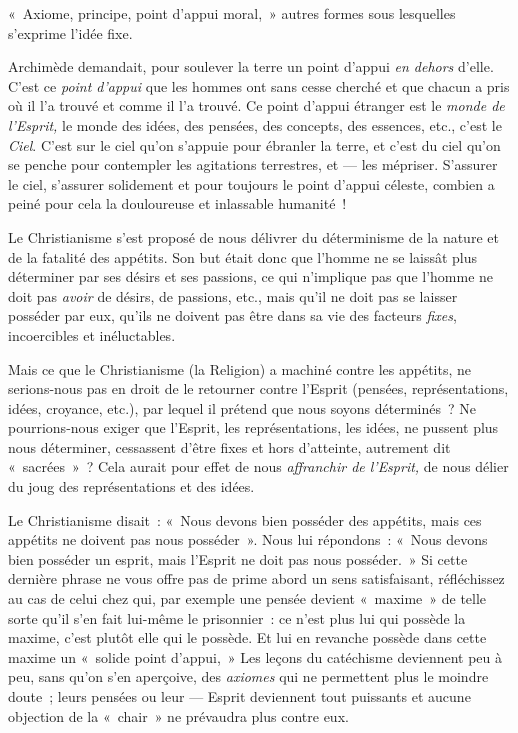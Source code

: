 \documentclass[french,twoside]{book} %
\begin{document}
\noindent « Axiome, principe, point d’appui moral, » autres formes sous lesquelles s’exprime l’idée fixe.\par
Archimède demandait, pour soulever la terre un point d’appui \emph{en dehors} d’elle. C’est ce \emph{point d’appui} que les hommes ont sans cesse cherché et que chacun a pris où il l’a trouvé et comme il l’a trouvé. Ce point d’appui étranger est le \emph{monde de l’Esprit,} le monde des idées, des pensées, des concepts, des essences, etc., c’est le \emph{Ciel}. C’est sur le ciel qu’on s’appuie pour ébranler la terre, et c’est du ciel qu’on se penche pour contempler les agitations terrestres, et — les mépriser. S’assurer le ciel, s’assurer solidement et pour toujours le point d’appui céleste, combien a peiné pour cela la douloureuse et inlassable humanité !\par
Le Christianisme s’est proposé de nous délivrer du déterminisme de la nature et de la fatalité des appétits. Son but était donc que l’homme ne se laissât plus déterminer par ses désirs et ses passions, ce qui n’implique pas que l’homme ne doit pas \emph{avoir }de désirs, de passions, etc., mais qu’il ne doit pas se laisser posséder par eux, qu’ils ne doivent pas être dans sa vie des facteurs \emph{fixes}, incoercibles et inéluctables.\par
Mais ce que le Christianisme (la Religion) a machiné contre les appétits, ne serions-nous pas en droit de le retourner contre l’Esprit (pensées, représentations, idées, croyance, etc.), par lequel il prétend que nous soyons déterminés ? Ne pourrions-nous exiger que l’Esprit, les représentations, les idées, ne pussent plus nous déterminer, cessassent d’être fixes et hors d’atteinte, autrement dit « sacrées » ? Cela  aurait pour effet de nous \emph{affranchir de l’Esprit,} de nous délier du joug des représentations et des idées.\par
Le Christianisme disait : « Nous devons bien posséder des appétits, mais ces appétits ne doivent pas nous posséder ». Nous lui répondons : « Nous devons bien posséder un esprit, mais l’Esprit ne doit pas nous posséder. » Si cette dernière phrase ne vous offre pas de prime abord un sens satisfaisant, réfléchissez au cas de celui chez qui, par exemple une pensée devient « maxime » de telle sorte qu’il s’en fait lui-même le prisonnier : ce n’est plus lui qui possède la maxime, c’est plutôt elle qui le possède. Et lui en revanche possède dans cette maxime un « solide point d’appui, » Les leçons du catéchisme deviennent peu à peu, sans qu’on s’en aperçoive, des \emph{axiomes} qui ne permettent plus le moindre doute ; leurs pensées ou leur — Esprit deviennent tout puissants et aucune objection de la « chair » ne prévaudra plus contre eux.\par
\end{document}
